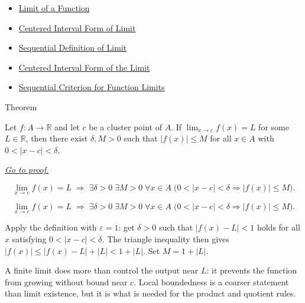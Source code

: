 \begin{dependencies}
\begin{itemize}
  \item \hyperref[def:limit-function]{Limit of a Function}
  \item \hyperref[def:limit-function-neighbourhood]{Centered Interval Form of Limit}
  \item \hyperref[def:limit-function-sequential]{Sequential Definition of Limit}
  \item \hyperref[prop:limit-neighbourhood-equiv]{Centered Interval Form of the Limit}
  \item \hyperref[prop:sequential-criterion-limits]{Sequential Criterion for Function Limits}
\end{itemize}
\end{dependencies}


\begin{theorembox}{Theorem}
\begin{theorem}
\label{thm:limit-implies-local-bounding}
Let $f : A \to \mathbb{R}$ and let $c$ be a cluster point of $A$.
If $\lim_{x\to c}f(x)=L$ for some $L \in \mathbb{R}$,
then there exist $\delta, M > 0$ such that $|f(x)| \leq M$ for all
$x \in A$ with $0<|x-c|<\delta$.

\smallskip\noindent
\hyperref[prf:limit-implies-local-bounding]{\textit{Go to proof.}}
\end{theorem}
\end{theorembox}

\begin{remark*}
\[
  \lim_{x\to c}f(x)=L
  \;\Rightarrow\;
  \exists\delta>0\;\exists M>0\;\forall x\in A\;
  \bigl(0<|x-c|<\delta\Rightarrow |f(x)|\leq M\bigr).
\]
\end{remark*}

\begin{remark*}
\[
\lim_{x\to c}f(x)=L
  \;\Rightarrow\;
  \exists\delta>0\;\exists M>0\;\forall x\in A\;
  \bigl(0<|x-c|<\delta\Rightarrow |f(x)|\leq M\bigr).
\]
\end{remark*}

\begin{remark*}[Interpretation]
Apply the definition with $\varepsilon = 1$: get $\delta > 0$ such
that $|f(x)-L|<1$ holds for all $x$
satisfying $0<|x-c|<\delta$. The triangle
inequality then gives $|f(x)| \leq |f(x)-L| + |L| < 1 + |L|$.
Set $M = 1 + |L|$.


A finite limit does more than control the output near $L$: it
prevents the function from growing without bound near $c$. Local
boundedness is a coarser statement than limit existence, but it is
what is needed for the product and quotient rules.
\end{remark*}

